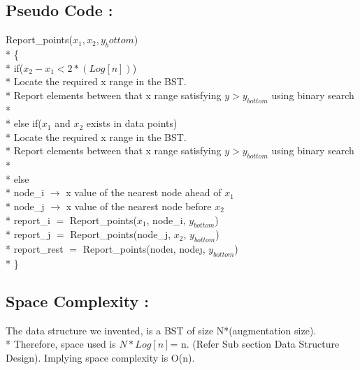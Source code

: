 \documentclass{article}
\begin{document}
\subsection{Pseudo Code : }
Report\_points($x_1,x_2,y_bottom$)	\\*
\{			\\*
	\hspace*{1cm}if($ x_2-x_1 <2*(Log[n])$) \\*
	\hspace*{2cm} Locate the required x range in the BST. \\*
	\hspace*{2cm}Report elements between that x range satisfying $y > y_{bottom}$ using binary search \\*
	\\*
	\hspace*{1cm}else if($x_1$ and $x_2$ exists in data points)\\*
	\hspace*{2cm} Locate the required x range in the BST. \\*
	\hspace*{2cm}Report elements between that x range satisfying $y > y_{bottom}$ using binary search \\*
	\\*
	\hspace*{1cm}else \\*
	\hspace*{1cm}node\_i $ \longrightarrow $ x value of the nearest node ahead of $x_1$ \\*
	\hspace*{1cm}node\_j $ \longrightarrow $  x value of the nearest node before $x_2$ \\*
	\hspace*{1cm}report\_i $ = $ Report\_points($x_1$, node\_i, $y_{bottom}$)		\\*
	\hspace*{1cm}report\_j $ = $ Report\_points(node\_j, $x_2$, $y_{bottom}$)		\\*
	\hspace*{1cm}report\_rest $ = $ Report\_points(node\i, node\j, $y_{bottom}$)		\\*
\}	 
\subsection{Space Complexity : }
	The data structure we invented, is a BST of size N*(augmentation size).\\*
Therefore, space used is $N * Log[n]$= n. (Refer Sub section Data Structure Design).
Implying space complexity is O(n).
\end{document}
